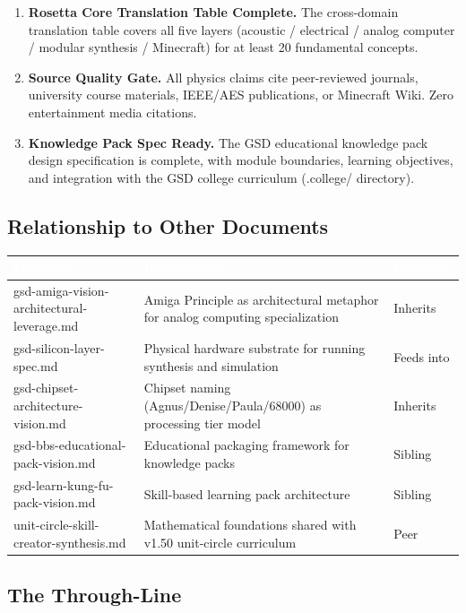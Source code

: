 \documentclass[11pt,letterpaper]{article}
\newcommand{\tableheader}[1]{\textbf{\sffamily\textcolor{white}{#1}}}
\begin{document}
\begin{enumerate}[leftmargin=2em]
  \item \textbf{Rosetta Core Translation Table Complete.} The cross-domain translation table covers all five layers (acoustic / electrical / analog computer / modular synthesis / Minecraft) for at least 20 fundamental concepts.
  \item \textbf{Source Quality Gate.} All physics claims cite peer-reviewed journals, university course materials, IEEE/AES publications, or Minecraft Wiki. Zero entertainment media citations.
  \item \textbf{Knowledge Pack Spec Ready.} The GSD educational knowledge pack design specification is complete, with module boundaries, learning objectives, and integration with the GSD college curriculum (.college/ directory).
\end{enumerate}

\subsection{Relationship to Other Documents}

\begin{center}
\begin{tabularx}{\textwidth}{L{5cm}XC{2.5cm}}
\toprule
{}
\tableheader{Document} & \tableheader{Relationship} & \tableheader{Direction} \\
\midrule
gsd-amiga-vision-architectural-leverage.md & Amiga Principle as architectural metaphor for analog computing specialization & Inherits \\
gsd-silicon-layer-spec.md & Physical hardware substrate for running synthesis and simulation & Feeds into \\
gsd-chipset-architecture-vision.md & Chipset naming (Agnus/Denise/Paula/68000) as processing tier model & Inherits \\
gsd-bbs-educational-pack-vision.md & Educational packaging framework for knowledge packs & Sibling \\
gsd-learn-kung-fu-pack-vision.md & Skill-based learning pack architecture & Sibling \\
unit-circle-skill-creator-synthesis.md & Mathematical foundations shared with v1.50 unit-circle curriculum & Peer \\
\bottomrule
\end{tabularx}
\end{center}

\subsection{The Through-Line}
\end{document}
